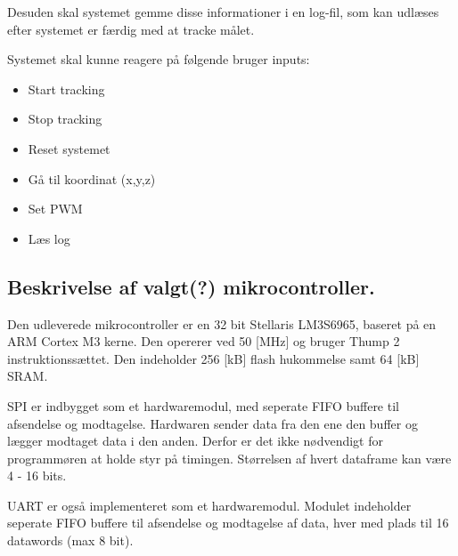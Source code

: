 

Desuden skal systemet gemme disse informationer i en log-fil, som kan udlæses efter systemet er færdig med at tracke målet. 

Systemet skal kunne reagere på følgende bruger inputs:


\begin{itemize}
\itemsep1pt
	\item Start tracking
	\item Stop tracking
	\item Reset systemet
	\item Gå til koordinat (x,y,z)
	\item Set PWM
	\item Læs log
\end{itemize}


\subsection{Beskrivelse af valgt(?) mikrocontroller.}
Den udleverede mikrocontroller er en 32 bit Stellaris LM3S6965, baseret på en ARM Cortex M3 kerne. Den opererer ved 50 [MHz] og bruger Thump 2 instruktionssættet. Den indeholder 256 [kB] flash hukommelse samt 64 [kB] SRAM. 
\citep{lm3s6965}

SPI er indbygget som et hardwaremodul, med seperate FIFO buffere til afsendelse og modtagelse. Hardwaren sender data fra den ene den buffer og lægger modtaget data i den anden. Derfor er det ikke nødvendigt for programmøren at holde styr på timingen. Størrelsen af hvert dataframe kan være 4 - 16 bits. 

UART er også implementeret som et hardwaremodul. Modulet indeholder seperate FIFO buffere til afsendelse og modtagelse af data, hver med plads til 16 datawords (max 8 bit). 



